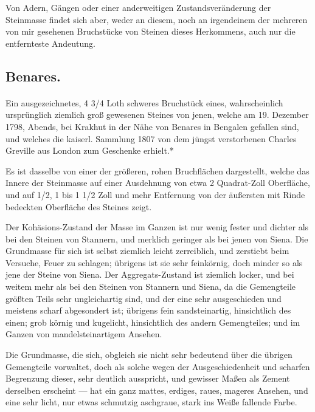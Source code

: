 \documentclass[a4paper, 11pt, oneside, german]{article}
\begin{document}
Von Adern, Gängen oder einer anderweitigen Zustandsveränderung der Steinmasse findet sich aber, weder an diesem, noch an irgendeinem der mehreren von mir gesehenen Bruchstücke von Steinen dieses Herkommens, auch nur die entfernteste Andeutung.

\subsection{Benares.}
\paragraph{}
Ein ausgezeichnetes, 4 3/4 Loth schweres Bruchstück eines, wahrscheinlich ursprünglich ziemlich groß gewesenen Steines von jenen, welche am 19. Dezember 1798, Abends, bei Krakhut in der Nähe von Benares in Bengalen gefallen sind, und welches die kaiserl. Sammlung 1807 von dem jüngst verstorbenen Charles Greville aus London zum Geschenke erhielt.*

Es ist dasselbe von einer der größeren, rohen Bruchflächen dargestellt, welche das Innere der Steinmasse auf einer Ausdehnung von etwa 2 Quadrat-Zoll Oberfläche, und auf 1/2, 1 bis 1 1/2 Zoll und mehr Entfernung von der äußersten mit Rinde bedeckten Oberfläche des Steines zeigt.

Der Kohäsions-Zustand der Masse im Ganzen ist nur wenig fester und dichter als bei den Steinen von Stannern, und merklich geringer als bei jenen von Siena. Die Grundmasse für sich ist selbst ziemlich leicht zerreiblich, und zerstiebt beim Versuche, Feuer zu schlagen; übrigens ist sie sehr feinkörnig, doch minder so als jene der Steine von Siena. Der Aggregats-Zustand ist ziemlich locker, und bei weitem mehr als bei den Steinen von Stannern und Siena, da die Gemengteile größten Teils sehr ungleichartig sind, und der eine sehr ausgeschieden und meistens scharf abgesondert ist; übrigens fein sandsteinartig, hinsichtlich des einen; grob körnig und kugelicht, hinsichtlich des andern Gemengteiles; und im Ganzen von mandelsteinartigem Ansehen.

Die Grundmasse, die sich, obgleich sie nicht sehr bedeutend über die übrigen Gemengteile vorwaltet, doch als solche wegen der Ausgeschiedenheit und scharfen Begrenzung dieser, sehr deutlich ausspricht, und gewisser Maßen als Zement derselben erscheint --- hat ein ganz mattes, erdiges, raues, mageres Ansehen, und eine sehr licht, nur etwas schmutzig aschgraue, stark ins Weiße fallende Farbe.
\end{document}
